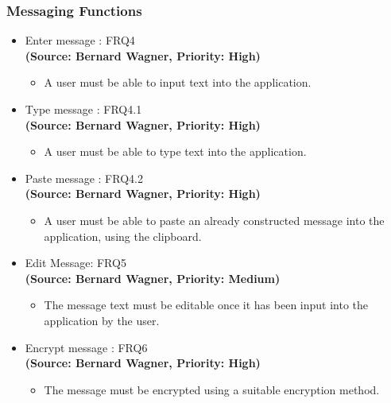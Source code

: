 \subsubsection{Messaging Functions}
\begin{itemize}
\item{Enter message : FRQ4}\\%
\textbf{(Source: Bernard Wagner, Priority: High)}
\begin{itemize}
\item A user must be able to input text into the application.
\end{itemize}
\item{Type message : FRQ4.1}\\
\textbf{(Source: Bernard Wagner, Priority: High)}
\begin{itemize}
\item A user must be able to type text into the application.
\end{itemize}
\item{Paste message : FRQ4.2}\\
\textbf{(Source: Bernard Wagner, Priority: High)}
\begin{itemize}
\item A user must be able to paste an already constructed message into the application, using the clipboard.
\end{itemize}
\item{Edit Message: FRQ5}\\
\textbf{(Source: Bernard Wagner, Priority: Medium)}
\begin{itemize}
\item The message text must be editable once it has been input into the application by the user.
\end{itemize}
\item{Encrypt message : FRQ6}\\
\textbf{(Source: Bernard Wagner, Priority: High)}
\begin{itemize}
\item The message must be encrypted using a suitable encryption method.

\end{itemize}
\end{itemize}
